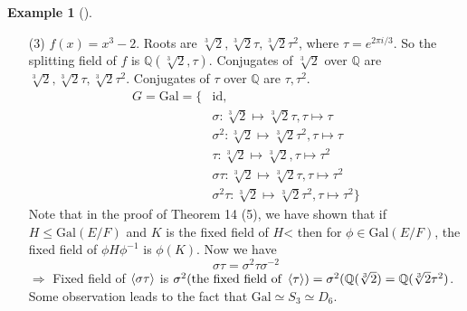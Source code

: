 \documentclass{article}
\theoremstyle{definition}
\newtheorem{ex}{Example}
\newenvironment{exs}[1][]{%
  \begin{ex}[#1]$ $\par\nobreak\ignorespaces
}{%
  \end{ex}
}
\newcommand{\QQ}{\mathbb Q}
\newcommand{\Ra}{\Rightarrow}
\begin{document}
\begin{exs}
\begin{enumerate}
		\item[(3)] $f(x) = x^3 - 2$.
				Roots are $\sqrt[3]{2}, \sqrt[3]{2} \tau, \sqrt[3]{2} \tau^2$, where $\tau = e^{2 \pi i/3}$.
				So the splitting field of $f$ is $\QQ(\sqrt[3]{2}, \tau)$.
				Conjugates of $\sqrt[3]{2}$ over $\QQ$ are $\sqrt[3]{2}, \sqrt[3]{2} \tau, \sqrt[3]{2} \tau^2$.
				Conjugates of $\tau$ over $\QQ$ are $\tau, \tau^2$.
				\[
					\begin{split}
						G = \text{Gal} = \{&\text{id},\\
						&\sigma: \sqrt[3]{2} \mapsto \sqrt[3]{2} \tau, \tau \mapsto \tau\\
						&\sigma^2: \sqrt[3]{2} \mapsto \sqrt[3]{2} \tau^2, \tau \mapsto \tau\\
						&\tau: \sqrt[3]{2} \mapsto \sqrt[3]{2}, \tau \mapsto \tau^2\\
						&\sigma \tau: \sqrt[3]{2} \mapsto \sqrt[3]{2} \tau, \tau \mapsto \tau^2\\
						&\sigma^2 \tau: \sqrt[3]{2} \mapsto \sqrt[3]{2} \tau^2, \tau \mapsto \tau^2\}
					\end{split}
				\]
				Note that in the proof of Theorem 14 (5), we have shown that if $H \leq \text{Gal}(E/F)$ and $K$ is the fixed field of $H$< then for $\phi \in \text{Gal}(E/F)$, the fixed field of $\phi H \phi^{-1}$ is $\phi(K)$.
				Now we have
				\[
					\sigma \tau = \sigma^2 \tau \sigma^{-2}
				\]
				$\Ra$ Fixed field of $\ev{\sigma \tau}$ is $\sigma^2 (\text{the fixed field of }\ev{\tau}) = \sigma^2 (\QQ(\sqrt[3]{2}) = \QQ(\sqrt[3]{2} \tau^2)$.
				Some observation leads to the fact that $\text{Gal} \simeq S_3 \simeq D_6$.

				\begin{figure}[H]
					\centering
\end{figure}
\end{enumerate}
\end{exs}
\end{document}
